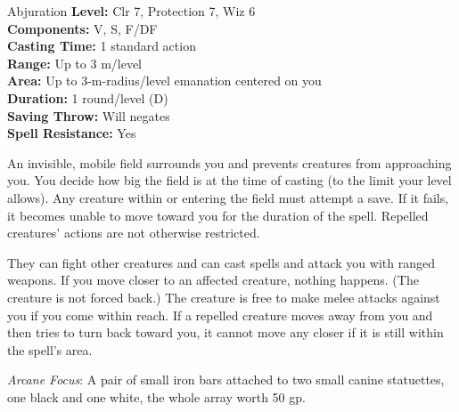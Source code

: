 {Abjuration}
{
	\textbf{Level:}
	Clr 7, Protection 7, Wiz 6\\
	\textbf{Components:}
	V, S, F/DF\\
	\textbf{Casting Time:}
	1 standard action\\
	\textbf{Range:}
	Up to 3 m/level\\
	\textbf{Area:}
	Up to 3-m-radius/level emanation centered on you\\
	\textbf{Duration:}
	1 round/level (D)\\
	\textbf{Saving Throw:}
	Will negates\\
	\textbf{Spell Resistance:}
	Yes\\
}
{
	An invisible, mobile field surrounds you and prevents creatures from approaching you. You decide how big the field is at the time of casting (to the limit your level allows). Any creature within or entering the field must attempt a save. If it fails, it becomes unable to move toward you for the duration of the spell. Repelled creatures' actions are not otherwise restricted.

	They can fight other creatures and can cast spells and attack you with ranged weapons. If you move closer to an affected creature, nothing happens. (The creature is not forced back.) The creature is free to make melee attacks against you if you come within reach. If a repelled creature moves away from you and then tries to turn back toward you, it cannot move any closer if it is still within the spell's area.

	\textit{Arcane Focus}:
	A pair of small iron bars attached to two small canine statuettes, one black and one white, the whole array worth 50 gp.

}
